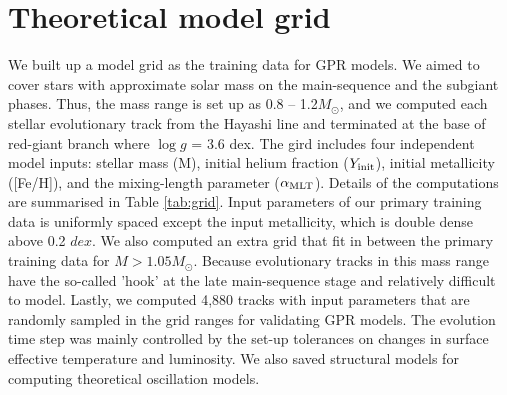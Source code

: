 \section{Theoretical  model grid}\label{sec:grid}

We built up a model grid as the training data for GPR models.  We aimed to cover stars with approximate solar mass on the main-sequence and the subgiant phases. Thus, the mass range is set up as 0.8 -- 1.2$M_{\odot}$, and we computed each stellar evolutionary track from the Hayashi line and terminated at the base of red-giant branch where $\log g$ = 3.6 dex. The gird includes four independent model inputs: stellar mass (M), initial helium fraction ($Y_{\rm init}$), initial metallicity ([Fe/H]), and the mixing-length parameter ($\alpha_{\rm MLT}$). Details of the computations are summarised in Table \ref{tab:grid}. Input parameters of our primary training data is uniformly spaced except the input metallicity, which is double dense above 0.2 $dex$. We also computed an extra grid that fit in between the primary training data for $M > 1.05M_{\odot}$. Because evolutionary tracks in this mass range have the so-called 'hook' at the late main-sequence stage and relatively difficult to model. Lastly, we computed 4,880 tracks with input parameters that are randomly sampled in the grid ranges for validating GPR models. The evolution time step was mainly controlled by the set-up tolerances on changes in surface effective temperature and luminosity. We also saved structural models for computing theoretical oscillation models.

